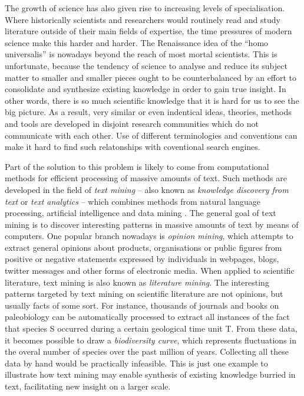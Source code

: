The growth of science has also given rise to increasing levels of specialisation.
Where historically scientists and researchers would routinely read and study literature outside of their main fields of expertise, the time pressures of modern science make this harder and harder.
The Renaissance idea of the ``homo universalis'' is nowadays beyond the reach of most mortal scientists.
This is unfortunate, because the tendency of science to analyse and reduce its subject matter to smaller and smaller pieces ought to be counterbalanced by an effort to consolidate and synthesize existing knowledge in order to gain true insight.    
In other words, there is so much scientific knowledge that it is hard for us to see the big picture.
As a result, very similar or even indentical ideas, theories, methods and tools are developed in disjoint research communities which do not communicate with each other.
Use of different terminologies and conventions can make it hard to find such relatonships with coventional search engines.  

Part of the solution to this problem is likely to come from computational methods for efficient processing of massive amounts of text.
Such methods are developed in the field of \emph{text mining} -- also known as \emph{knowledge discovery from text} or \emph{text analytics} -- which combines methods from natural language processing, artificial intelligence and data mining \citep{Aggarwal2012Mining,Weiss2012Fundamentals}.
The general goal of text mining is to discover interesting patterns in massive amounts of text by means of computers.
One popular branch nowadays is \emph{opinion mining}, which attempts to extract general opinions about products, organisations or public figures from positive or negative statements expressed by individuals in webpages, blogs, twitter messages and other forms of electronic media.
When applied to scientific literature, text mining is also known as \emph{literature mining}. The interesting patterns targeted by text mining on scientific literature are not opinions, but usually facts of some sort.
For instance, thousands of journals and books on paleobiology can be automatically processed to extract all instances of the fact that species S occurred during a certain geological time unit T.
From these data, it becomes possible to draw a \emph{biodiversity curve}, which represents fluctuations in the overal number of species over the past million of years.
Collecting all these data by hand would be practically infeasible.
This is just one example to illustrate how text mining may enable synthesis of existing knowledge burried in text, facilitating new insight on a larger scale.  

